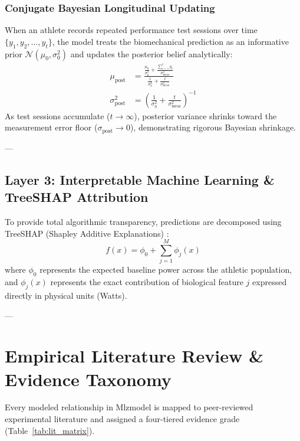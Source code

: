 \documentclass[11pt,a4paper]{article}
\begin{document}
\subsubsection{Conjugate Bayesian Longitudinal Updating}
When an athlete records repeated performance test sessions over time $\{y_1, y_2, \dots, y_t\}$, the model treats the biomechanical prediction as an informative prior $\mathcal{N}(\mu_0, \sigma_0^2)$ and updates the posterior belief analytically:
\begin{align}
    \mu_{\text{post}} &= \frac{\frac{\mu_0}{\sigma_0^2} + \frac{\sum_{i=1}^t y_i}{\sigma_{\text{meas}}^2}}{\frac{1}{\sigma_0^2} + \frac{t}{\sigma_{\text{meas}}^2}} \\
    \sigma_{\text{post}}^2 &= \left(\frac{1}{\sigma_0^2} + \frac{t}{\sigma_{\text{meas}}^2}\right)^{-1}
\end{align}
As test sessions accumulate ($t \to \infty$), posterior variance shrinks toward the measurement error floor ($\sigma_{\text{post}} \to 0$), demonstrating rigorous Bayesian shrinkage.

---

\subsection{Layer 3: Interpretable Machine Learning \& TreeSHAP Attribution}

To provide total algorithmic transparency, predictions are decomposed using TreeSHAP (Shapley Additive Explanations) \cite{lundberg2017}:
\begin{equation}
    f(x) = \phi_0 + \sum_{j=1}^M \phi_j(x)
\end{equation}
where $\phi_0$ represents the expected baseline power across the athletic population, and $\phi_j(x)$ represents the exact contribution of biological feature $j$ expressed directly in physical units (Watts).

---

\section{Empirical Literature Review \& Evidence Taxonomy}

Every modeled relationship in Mlzmodel is mapped to peer-reviewed experimental literature and assigned a four-tiered evidence grade (Table~\ref{tab:lit_matrix}).
\end{document}

